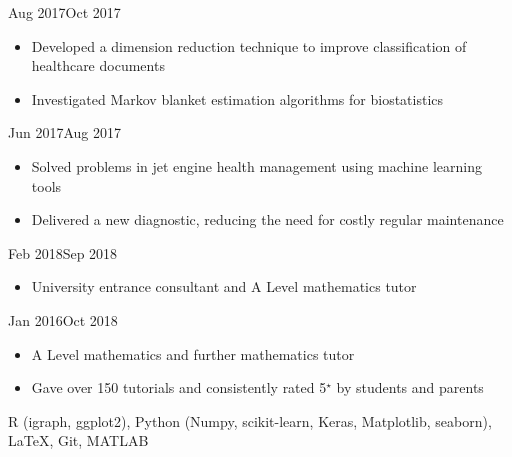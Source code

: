 \documentclass[
  date,
  number,
]{wgu-cv}
\begin{document}
{}
{Aug 2017}{Oct 2017}

\begin{itemize}
	\item Developed a dimension reduction technique to improve classification of healthcare documents
	\item Investigated Markov blanket estimation algorithms for biostatistics
\end{itemize}


{}
{Jun 2017}{Aug 2017}

\begin{itemize}
	\item Solved problems in jet engine health management using machine learning tools
	\item Delivered a new diagnostic, reducing the need for costly regular maintenance
\end{itemize}



{}
{Feb 2018}{Sep 2018}

\begin{itemize}
	\item University entrance consultant and A Level mathematics tutor
\end{itemize}


{}
{Jan 2016}{Oct 2018}

\begin{itemize}
	\item A Level mathematics and further mathematics tutor
	\item Gave over 150 tutorials and consistently rated 5$^\star$ by students and parents
\end{itemize}



R (igraph, ggplot2),
Python (Numpy, scikit-learn, Keras, Matplotlib, seaborn),
LaTeX,
Git,
MATLAB


\end{document}
